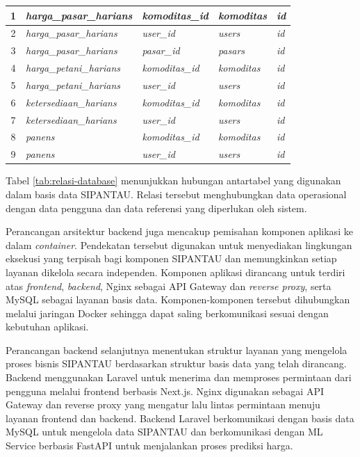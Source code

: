 \begin{longtable}{|c|p{4.1cm}|p{2.8cm}|p{2.3cm}|p{1.8cm}|}
    1 & \textit{harga\_pasar\_harians} & \textit{komoditas\_id} & \textit{komoditas} & \textit{id} \\ \hline
    2 & \textit{harga\_pasar\_harians} & \textit{user\_id} & \textit{users} & \textit{id} \\ \hline
    3 & \textit{harga\_pasar\_harians} & \textit{pasar\_id} & \textit{pasars} & \textit{id} \\ \hline
    4 & \textit{harga\_petani\_harians} & \textit{komoditas\_id} & \textit{komoditas} & \textit{id} \\ \hline
    5 & \textit{harga\_petani\_harians} & \textit{user\_id} & \textit{users} & \textit{id} \\ \hline
    6 & \textit{ketersediaan\_harians} & \textit{komoditas\_id} & \textit{komoditas} & \textit{id} \\ \hline
    7 & \textit{ketersediaan\_harians} & \textit{user\_id} & \textit{users} & \textit{id} \\ \hline
    8 & \textit{panens} & \textit{komoditas\_id} & \textit{komoditas} & \textit{id} \\ \hline
    9 & \textit{panens} & \textit{user\_id} & \textit{users} & \textit{id} \\ \hline

\end{longtable}

Tabel \ref{tab:relasi-database} menunjukkan hubungan antartabel yang digunakan dalam basis data SIPANTAU. Relasi tersebut menghubungkan data operasional dengan data pengguna dan data referensi yang diperlukan oleh sistem.

Perancangan arsitektur backend juga mencakup pemisahan komponen aplikasi ke dalam \textit{container}. Pendekatan tersebut digunakan untuk menyediakan lingkungan eksekusi yang terpisah bagi komponen SIPANTAU dan memungkinkan setiap layanan dikelola secara independen. Komponen aplikasi dirancang untuk terdiri atas \textit{frontend}, \textit{backend}, Nginx sebagai API Gateway dan \textit{reverse proxy}, serta MySQL sebagai layanan basis data. Komponen-komponen tersebut dihubungkan melalui jaringan Docker sehingga dapat saling berkomunikasi sesuai dengan kebutuhan aplikasi.

Perancangan backend selanjutnya menentukan struktur layanan yang mengelola proses bisnis SIPANTAU berdasarkan struktur basis data yang telah dirancang. Backend menggunakan Laravel untuk menerima dan memproses permintaan dari pengguna melalui frontend berbasis Next.js. Nginx digunakan sebagai API Gateway dan reverse proxy yang mengatur lalu lintas permintaan menuju layanan frontend dan backend. Backend Laravel berkomunikasi dengan basis data MySQL untuk mengelola data SIPANTAU dan berkomunikasi dengan ML Service berbasis FastAPI untuk menjalankan proses prediksi harga.

